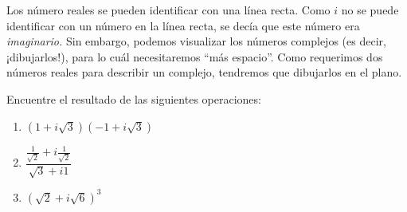 \begin{rem}
Los número reales se pueden identificar con una línea recta. Como $i$ no se puede identificar con un número en la línea
recta, se decía que este número era \emph{imaginario.} Sin embargo, podemos visualizar los números complejos (es decir,
¡dibujarlos!), para lo cuál necesitaremos ``más espacio''. Como requerimos dos números reales para describir un
complejo, tendremos que dibujarlos en el plano.
\end{rem}

\begin{problema}
\label{exe:1.1.1}
 Encuentre el resultado de las siguientes operaciones:
 \begin{enumerate}
  \item $\left( 1+i\sqrt{3} \right)\left( -1 +i\sqrt{3} \right)$
  \item $\dfrac{\frac{1}{\sqrt{2}}+i\frac{1}{\sqrt{2}}}{\sqrt{3}+i1}$
  \item $\left( \sqrt{2}+i\sqrt{6} \right)^{3}$
 \end{enumerate}

\end{problema}
